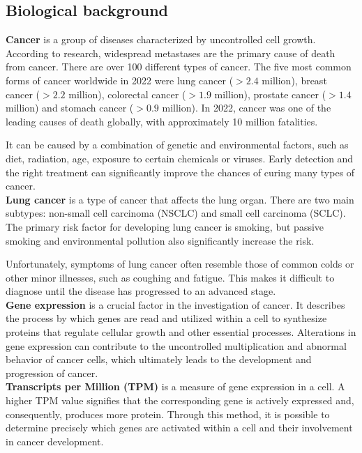 \subsection{Biological background} \label{subsec:biological_background}

\textbf{Cancer} is a group of diseases characterized by uncontrolled cell growth.
According to research, widespread metastases are the primary cause of death from cancer\cite{who_cancer_fact_sheet}.
There are over 100 different types of cancer\cite{nci_cancer_types}.
The five most common forms of cancer worldwide in 2022 were lung cancer ($>2.4$ million),
breast cancer ($>2.2$ million), colorectal cancer ($>1.9$ million), prostate cancer ($>1.4$ million) and
stomach cancer ($>0.9$ million).
In 2022, cancer was one of the leading causes of death globally,
with approximately 10 million fatalities\cite{ferlay2024global}.

It can be caused by a combination of genetic and environmental factors,
such as diet, radiation, age, exposure to certain chemicals or viruses\cite{nci_cancer_risk}.
Early detection and the right treatment can significantly improve the chances of curing many types of cancer.
\\

\textbf{Lung cancer} is a type of cancer that affects the lung organ.
There are two main subtypes: non-small cell carcinoma (NSCLC) and small cell carcinoma (SCLC)\cite{nci_lung_cancer_types}.
The primary risk factor for developing lung cancer is smoking,
but passive smoking and environmental pollution also significantly increase the risk\cite{nci_lung_cancer_types}.

Unfortunately, symptoms of lung cancer often resemble those of common colds or other minor illnesses,
such as coughing and fatigue.
This makes it difficult to diagnose until the disease has progressed to an advanced stage\cite{who_lung_cancer}.
\\

\textbf{Gene expression} is a crucial factor in the investigation of cancer.
It describes the process by which genes are read and utilized within a cell to synthesize proteins
that regulate cellular growth and other essential processes.
Alterations in gene expression can contribute to the uncontrolled multiplication and abnormal behavior of cancer cells,
which ultimately leads to the development and progression of cancer.
\\

\textbf{Transcripts per Million (TPM)} is a measure of gene expression in a cell.
A higher TPM value signifies that the corresponding gene is actively expressed and, consequently, produces more protein.
Through this method, it is possible to determine precisely which genes are activated within a cell and
their involvement in cancer development.


